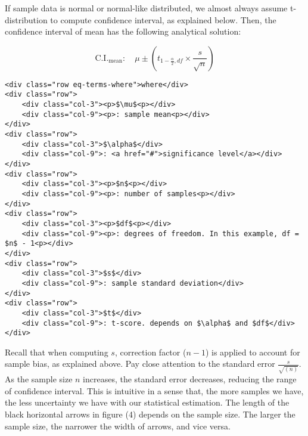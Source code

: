 \documentclass[11pt]{article}
\begin{document}
    If sample data is normal or normal-like distributed, we almost always
assume t-distribution to compute confidence interval, as explained
below. Then, the confidence interval of mean has the following
analytical solution:

\hypertarget{eq-1}{}
\[ \text{C.I.}_{\text{mean}}: \quad \mu \pm (t_{1-\frac{\alpha}{2},df} \times \frac{s}{\sqrt{n}}) \tag{1}\]

\begin{verbatim}
<div class="row eq-terms-where">where</div>
<div class="row">
    <div class="col-3"><p>$\mu$<p></div>
    <div class="col-9"><p>: sample mean<p></div>
</div>
<div class="row">
    <div class="col-3">$\alpha$</div>
    <div class="col-9">: <a href="#">significance level</a></div>
</div>    
<div class="row">
    <div class="col-3"><p>$n$<p></div>
    <div class="col-9"><p>: number of samples<p></div>
</div>
<div class="row">
    <div class="col-3"><p>$df$<p></div>
    <div class="col-9"><p>: degrees of freedom. In this example, df = $n$ - 1<p></div>
</div>    
<div class="row">
    <div class="col-3">$s$</div>
    <div class="col-9">: sample standard deviation</div>
</div>   
<div class="row">
    <div class="col-3">$t$</div>
    <div class="col-9">: t-score. depends on $\alpha$ and $df$</div>
</div>   
\end{verbatim}

Recall that when computing \(s\), correction factor (\(n-1\)) is applied
to account for sample bias, as explained above. Pay close attention to
the standard error \(\frac{s}{\sqrt{(n)}}\). As the sample size \(n\)
increases, the standard error decreases, reducing the range of
confidence interval. This is intuitive in a sense that, the more samples
we have, the less uncertainty we have with our statistical estimation.
The length of the black horizontal arrows in figure (4) depends on the
sample size. The larger the sample size, the narrower the width of
arrows, and vice versa.

\hypertarget{t_vs_z}{}
\end{document}
